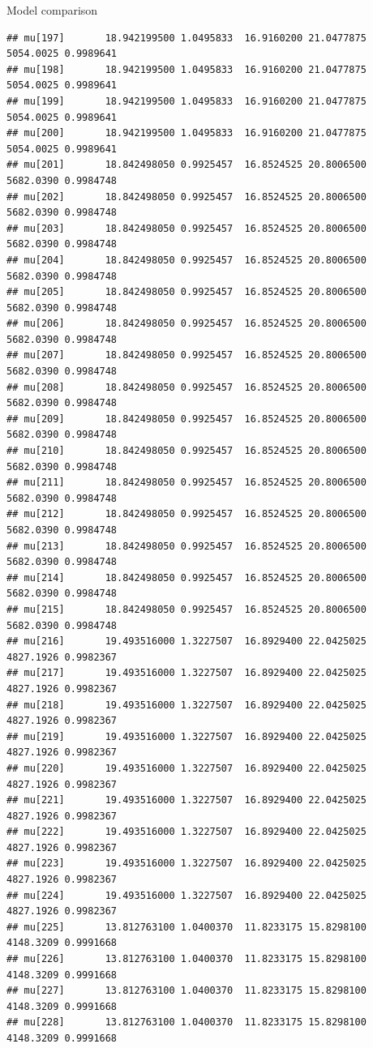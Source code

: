 \documentclass[
  ignorenonframetext,
]{beamer}
\begin{document}
\begin{frame}[fragile]{Model comparison}
\begin{verbatim}
## mu[197]       18.942199500 1.0495833  16.9160200 21.0477875 5054.0025 0.9989641
## mu[198]       18.942199500 1.0495833  16.9160200 21.0477875 5054.0025 0.9989641
## mu[199]       18.942199500 1.0495833  16.9160200 21.0477875 5054.0025 0.9989641
## mu[200]       18.942199500 1.0495833  16.9160200 21.0477875 5054.0025 0.9989641
## mu[201]       18.842498050 0.9925457  16.8524525 20.8006500 5682.0390 0.9984748
## mu[202]       18.842498050 0.9925457  16.8524525 20.8006500 5682.0390 0.9984748
## mu[203]       18.842498050 0.9925457  16.8524525 20.8006500 5682.0390 0.9984748
## mu[204]       18.842498050 0.9925457  16.8524525 20.8006500 5682.0390 0.9984748
## mu[205]       18.842498050 0.9925457  16.8524525 20.8006500 5682.0390 0.9984748
## mu[206]       18.842498050 0.9925457  16.8524525 20.8006500 5682.0390 0.9984748
## mu[207]       18.842498050 0.9925457  16.8524525 20.8006500 5682.0390 0.9984748
## mu[208]       18.842498050 0.9925457  16.8524525 20.8006500 5682.0390 0.9984748
## mu[209]       18.842498050 0.9925457  16.8524525 20.8006500 5682.0390 0.9984748
## mu[210]       18.842498050 0.9925457  16.8524525 20.8006500 5682.0390 0.9984748
## mu[211]       18.842498050 0.9925457  16.8524525 20.8006500 5682.0390 0.9984748
## mu[212]       18.842498050 0.9925457  16.8524525 20.8006500 5682.0390 0.9984748
## mu[213]       18.842498050 0.9925457  16.8524525 20.8006500 5682.0390 0.9984748
## mu[214]       18.842498050 0.9925457  16.8524525 20.8006500 5682.0390 0.9984748
## mu[215]       18.842498050 0.9925457  16.8524525 20.8006500 5682.0390 0.9984748
## mu[216]       19.493516000 1.3227507  16.8929400 22.0425025 4827.1926 0.9982367
## mu[217]       19.493516000 1.3227507  16.8929400 22.0425025 4827.1926 0.9982367
## mu[218]       19.493516000 1.3227507  16.8929400 22.0425025 4827.1926 0.9982367
## mu[219]       19.493516000 1.3227507  16.8929400 22.0425025 4827.1926 0.9982367
## mu[220]       19.493516000 1.3227507  16.8929400 22.0425025 4827.1926 0.9982367
## mu[221]       19.493516000 1.3227507  16.8929400 22.0425025 4827.1926 0.9982367
## mu[222]       19.493516000 1.3227507  16.8929400 22.0425025 4827.1926 0.9982367
## mu[223]       19.493516000 1.3227507  16.8929400 22.0425025 4827.1926 0.9982367
## mu[224]       19.493516000 1.3227507  16.8929400 22.0425025 4827.1926 0.9982367
## mu[225]       13.812763100 1.0400370  11.8233175 15.8298100 4148.3209 0.9991668
## mu[226]       13.812763100 1.0400370  11.8233175 15.8298100 4148.3209 0.9991668
## mu[227]       13.812763100 1.0400370  11.8233175 15.8298100 4148.3209 0.9991668
## mu[228]       13.812763100 1.0400370  11.8233175 15.8298100 4148.3209 0.9991668

\end{verbatim}
\end{frame}
\end{document}
